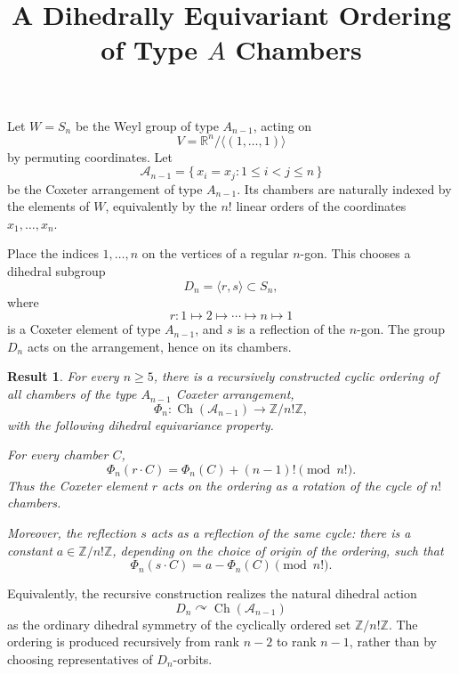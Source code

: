 \documentclass[11pt]{article}
\title{A Dihedrally Equivariant Ordering of Type \(A\) Chambers}
\author{}
\date{}
\newtheorem*{theorem}{Result}
\newcommand{\R}{\mathbb R}
\newcommand{\Z}{\mathbb Z}
\newcommand{\ch}{\operatorname{Ch}}
\begin{document}
\maketitle

Let \(W=S_n\) be the Weyl group of type \(A_{n-1}\), acting on
\[
  V=\R^n/\langle(1,\ldots,1)\rangle
\]
by permuting coordinates. Let
\[
  \mathcal A_{n-1}
  =
  \{\,x_i=x_j : 1\leq i<j\leq n\,\}
\]
be the Coxeter arrangement of type \(A_{n-1}\). Its chambers are naturally
indexed by the elements of \(W\), equivalently by the \(n!\) linear orders of
the coordinates \(x_1,\ldots,x_n\).

Place the indices \(1,\ldots,n\) on the vertices of a regular \(n\)-gon. This
chooses a dihedral subgroup
\[
  D_n=\langle r,s\rangle \subset S_n,
\]
where
\[
  r:1\mapsto 2\mapsto\cdots\mapsto n\mapsto 1
\]
is a Coxeter element of type \(A_{n-1}\), and \(s\) is a reflection of the
\(n\)-gon. The group \(D_n\) acts on the arrangement, hence on its chambers.

\begin{theorem}
For every \(n\geq 5\), there is a recursively constructed cyclic ordering of all
chambers of the type \(A_{n-1}\) Coxeter arrangement,
\[
  \Phi_n:\ch(\mathcal A_{n-1})\longrightarrow \Z/n!\Z,
\]
with the following dihedral equivariance property.

For every chamber \(C\),
\[
  \Phi_n(r\cdot C)
  =
  \Phi_n(C)+(n-1)!
  \pmod{n!}.
\]
Thus the Coxeter element \(r\) acts on the ordering as a rotation of the cycle
of \(n!\) chambers.

Moreover, the reflection \(s\) acts as a reflection of the same cycle: there is
a constant \(a\in\Z/n!\Z\), depending on the choice of origin of the ordering,
such that
\[
  \Phi_n(s\cdot C)
  =
  a-\Phi_n(C)
  \pmod{n!}.
\]
\end{theorem}

Equivalently, the recursive construction realizes the natural dihedral action
\[
  D_n\curvearrowright \ch(\mathcal A_{n-1})
\]
as the ordinary dihedral symmetry of the cyclically ordered set
\(\Z/n!\Z\). The ordering is produced recursively from rank \(n-2\) to rank
\(n-1\), rather than by choosing representatives of \(D_n\)-orbits.
\end{document}
